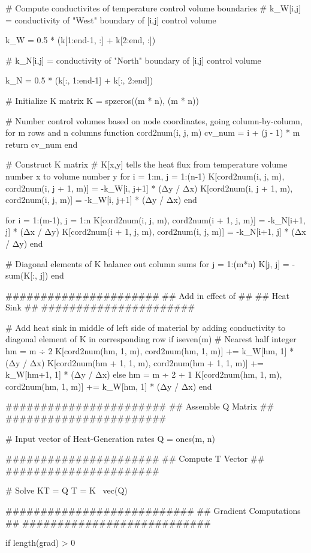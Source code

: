 \begin{jllisting}
	# Compute conductivites of temperature control volume boundaries
	# k_W[i,j] = conductivity of "West" boundary of [i,j] control volume

		k_W = 0.5 * (k[1:end-1, :] + k[2:end, :])
	
	# k_N[i,j] = conductivity of "North" boundary of [i,j] control volume
	
	k_N = 0.5 * (k[:, 1:end-1] + k[:, 2:end])
	
	# Initialize K matrix
	K = spzeros((m * n), (m * n))
	
	# Number control volumes based on node coordinates, going column-by-column, for m rows and n columns
	function cord2num(i, j, m)
	cv_num = i + (j - 1) * m
	return cv_num
	end
	
	# Construct K matrix
	# K[x,y] tells the heat flux from temperature volume number x to volume number y
	for i = 1:m, j = 1:(n-1)
	K[cord2num(i, j, m), cord2num(i, j + 1, m)] = -k_W[i, j+1] * (Δy / Δx)
	K[cord2num(i, j + 1, m), cord2num(i, j, m)] = -k_W[i, j+1] * (Δy / Δx)
	end
	
	for i = 1:(m-1), j = 1:n
	K[cord2num(i, j, m), cord2num(i + 1, j, m)] = -k_N[i+1, j] * (Δx / Δy)
	K[cord2num(i + 1, j, m), cord2num(i, j, m)] = -k_N[i+1, j] * (Δx / Δy)
	end
	
	# Diagonal elements of K balance out column sums
	for j = 1:(m*n)
	K[j, j] = -sum(K[:, j])
	end
	
	######################
	## Add in effect of ##
	##    Heat Sink     ##
	######################
	
	# Add heat sink in middle of left side of material by adding conductivity to diagonal element of K in corresponding row
	if iseven(m)
	# Nearest half integer
	hm = m ÷ 2
	K[cord2num(hm, 1, m), cord2num(hm, 1, m)] += k_W[hm, 1] * (Δy / Δx)
	K[cord2num(hm + 1, 1, m), cord2num(hm + 1, 1, m)] += k_W[hm+1, 1] * (Δy / Δx)
	else
	hm = m ÷ 2 + 1
	K[cord2num(hm, 1, m), cord2num(hm, 1, m)] += k_W[hm, 1] * (Δy / Δx)
	end
	
	#######################
	## Assemble Q Matrix ##
	#######################
	
	# Input vector of Heat-Generation rates
	Q = ones(m, n)

	######################
	## Compute T Vector ##
	######################
	
	# Solve KT = Q
	T = K \ vec(Q)
	
	###########################
	## Gradient Computations ##
	###########################
	
	if length(grad) > 0


\end{jllisting}
